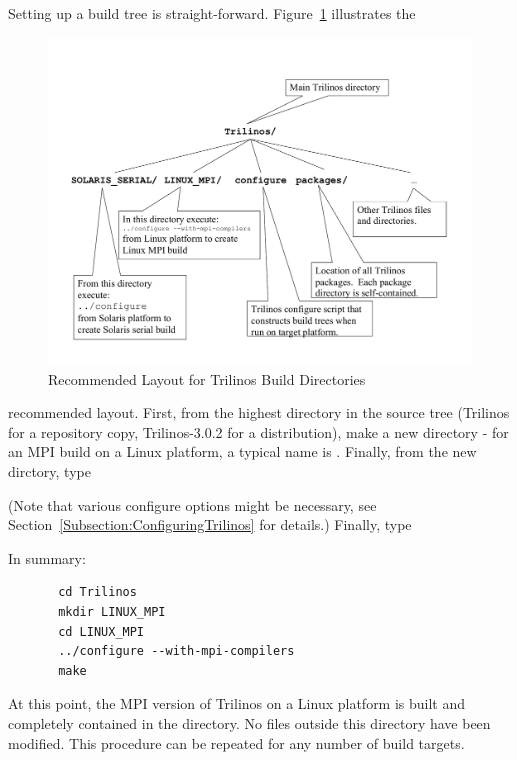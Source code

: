 \documentclass[12pt,relax]{TrilinosDevGuide}
\begin{document}
Setting up a build tree is straight-forward.
Figure~\ref{Figure:TrilinosDirectoryStructure} illustrates the
\begin{figure}
\begin{center}
\includegraphics[width=6in]{TrilinosDirectoryStructure}
\end{center}
\label{Figure:TrilinosDirectoryStructure}
\caption{Recommended Layout for Trilinos Build Directories}
\end{figure}recommended layout.  First, from the highest 
directory in the source tree (Trilinos for a repository copy, Trilinos-3.0.2 
for a distribution), make a new directory - for an MPI build
on a Linux platform, a 
typical name is .  
Finally, from the new dirctory, type


(Note that various configure options might be necessary, see Section~\ref{Subsection:ConfiguringTrilinos} for details.)  Finally, type



In summary:

\begin{verbatim}
       cd Trilinos
       mkdir LINUX_MPI
       cd LINUX_MPI
       ../configure --with-mpi-compilers
       make
\end{verbatim}
At this point, the MPI version of Trilinos on a Linux platform is
built and completely contained in the 
directory.  No files outside this directory have been modified.  This
procedure can be repeated for any number of build targets.
\end{document}
